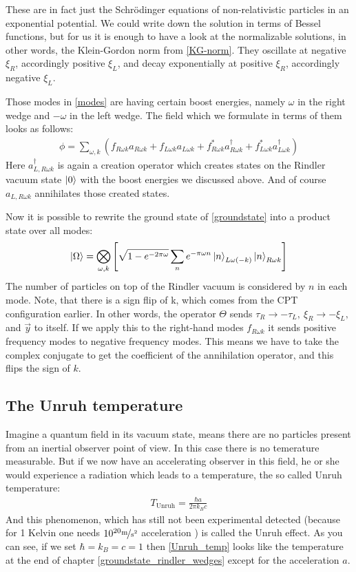 	These are in fact just the Schrödinger equations of non-relativistic particles in an exponential potential. We could write down the solution in terms of Bessel functions, but for us it is enough to have a look at the normalizable solutions, in other words, the Klein-Gordon norm from \eqref{KG-norm}. They oscillate at negative $\xi_R$, accordingly positive $\xi_L$, and decay exponentially at positive $\xi_R$, accordingly negative $\xi_L$.
	
	Those modes in \eqref{modes} are having certain boost energies, namely $\omega$ in the right wedge and $-\omega$ in the left wedge. The field which we formulate in terms of them looks as follows:
	\begin{align}
		\phi = \sum_{\omega, k} 
		\left(
			f_{R\omega k} a_{R\omega k} + f_{L\omega k}a_{L\omega k} + f^*_{R\omega k} a^\dagger_{R\omega k} + f^*_{L\omega k} a^\dagger_{L\omega k}
		\right)
	\end{align}
	Here $a^\dagger_{L,R\omega k}$ is again a creation operator which creates states on the Rindler vacuum state $\ket{0}$ with the boost energies we discussed above. And of course $a_{L,R\omega k}$ annihilates those created states. 
	
	Now it is possible to rewrite the ground state of \eqref{groundstate} into a product state over all modes:
	\begin{align}
		\ket{\Omega} = \bigotimes_{\omega, k} 
		\left[
			\sqrt{1-e^{-2\pi \omega}} \sum_n e^{-\pi \omega n} \ket{n}_{L \omega (-k)} \ket{n}_{R \omega k}
		\right]
	\end{align}
	The number of particles on top of the Rindler vacuum is considered by $n$ in each mode. Note, that there is a sign flip of k, which comes from the CPT configuration earlier. In other words, the operator $\Theta$ sends $\tau_R \rightarrow -\tau_L,~ \xi_R \rightarrow -\xi_L,$ and $\vec{y}$ to itself. If we apply this to the right-hand modes $f_{R\omega k}$ it sends positive frequency modes to negative frequency modes. This means we have to take the complex conjugate to get the coefficient of the annihilation operator, and this flips the sign of $k$.
\subsection{The Unruh temperature \checkmark} \label{Unruh}
Imagine a quantum field in its vacuum state, means there are no particles present from an inertial observer point of view. In this case there is no temerature measurable. But if we now have an accelerating observer in this field, he or she would experience a radiation which leads to a temperature, the so called Unruh temperature:
	\begin{align} \label{Unruh_temp}
		T_{\text{Unruh}}=\frac{\hbar a}{2\pi k_B c}
	\end{align}
And this phenomenon, which has still not been experimental detected (because for 1 Kelvin one needs $10^{20} \unitfrac{m}{s^2}$ acceleration \cite{scholarUnruh}) is called the Unruh effect. As you can see, if we set $\hbar = k_B = c = 1$ then \eqref{Unruh_temp} looks like the temperature at the end of chapter \ref{groundstate_rindler_wedges} except for the acceleration $a$.  


